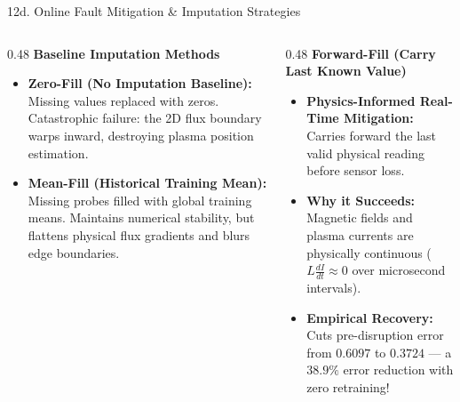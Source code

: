 \documentclass[aspectratio=169, 10pt]{beamer}
\begin{document}
\begin{frame}{12d. Online Fault Mitigation \& Imputation Strategies}
  \begin{columns}[T]
    \begin{column}{0.48\textwidth}
      \textbf{\color{NavyBlue} Baseline Imputation Methods}
      \begin{itemize}
        \item \textbf{Zero-Fill (No Imputation Baseline):}
          Missing values replaced with zeros.
          Catastrophic failure: the 2D flux boundary warps inward, destroying plasma position estimation.
        \item \textbf{Mean-Fill (Historical Training Mean):}
          Missing probes filled with global training means.
          Maintains numerical stability, but flattens physical flux gradients and blurs edge boundaries.
      \end{itemize}
    \end{column}

    \begin{column}{0.48\textwidth}
      \textbf{\color{NavyBlue} Forward-Fill (Carry Last Known Value)}
      \begin{itemize}
        \item \textbf{Physics-Informed Real-Time Mitigation:}
          Carries forward the last valid physical reading before sensor loss.
        \item \textbf{Why it Succeeds:}
          Magnetic fields and plasma currents are physically continuous ($L \frac{dI}{dt} \approx 0$ over microsecond intervals).
        \item \textbf{Empirical Recovery:}
          Cuts pre-disruption error from $0.6097$ to $\mathbf{0.3724}$ --- a $\mathbf{38.9\%}$ error reduction with zero retraining!
      \end{itemize}
    \end{column}
  \end{columns}
\end{frame}
\end{document}
